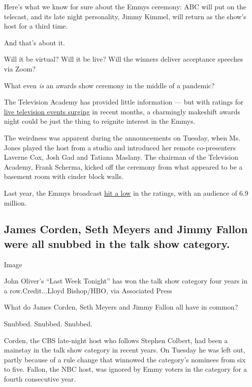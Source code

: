 Here's what we know for sure about the Emmys ceremony: ABC will put on
the telecast, and its late night personality, Jimmy Kimmel, will return
as the show's host for a third time.

And that's about it.

Will it be virtual? Will it be live? Will the winners deliver acceptance
speeches via Zoom?

What even \emph{is} an awards show ceremony in the middle of a pandemic?

The Television Academy has provided little information --- but with
ratings for
\href{https://www.espn.com/mlb/story/_/id/29532370/mlb-opener-was-most-viewed-regular-season-game-2011}{live
television events surging} in recent months, a charmingly makeshift
awards night could be just the thing to reignite interest in the Emmys.

The weirdness was apparent during the announcements on Tuesday, when Ms.
Jones played the host from a studio and introduced her remote
co-presenters Laverne Cox, Josh Gad and Tatiana Maslany. The chairman of
the Television Academy, Frank Scherma, kicked off the ceremony from what
appeared to be a basement room with cinder block walls.

Last year, the Emmys broadcast
\href{https://www.nytimes.com/2019/09/23/business/media/emmy-ratings.html}{hit
a low} in the ratings, with an audience of 6.9 million.

\hypertarget{james-corden-seth-meyers-and-jimmy-fallon-were-all-snubbed-in-the-talk-show-category}{%
\subsection{James Corden, Seth Meyers and Jimmy Fallon were all snubbed
in the talk show
category.}\label{james-corden-seth-meyers-and-jimmy-fallon-were-all-snubbed-in-the-talk-show-category}}

Image

John Oliver's ``Last Week Tonight'' has won the talk show category four
years in a row.Credit...Lloyd Bishop/HBO, via Associated Press

What do James Corden, Seth Meyers and Jimmy Fallon all have in common?

Snubbed. Snubbed. Snubbed.

Corden, the CBS late-night host who follows Stephen Colbert, had been a
mainstay in the talk show category in recent years. On Tuesday he was
left out, partly because of a rule change that winnowed the category's
nominees from six to five. Fallon, the NBC host, was ignored by Emmy
voters in the category for a fourth consecutive year.

